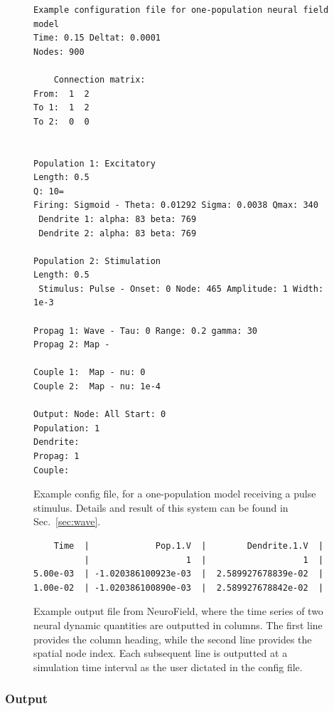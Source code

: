 \documentclass[preprint,review,10pt,authoryear,letterpaper]{elsarticle}
\begin{document}
\begin{figure}[!htbp]
\begin{center}
\begin{lstlisting}
Example configuration file for one-population neural field model
Time: 0.15 Deltat: 0.0001
Nodes: 900

    Connection matrix:
From:  1  2 
To 1:  1  2  
To 2:  0  0  


Population 1: Excitatory
Length: 0.5
Q: 10=
Firing: Sigmoid - Theta: 0.01292 Sigma: 0.0038 Qmax: 340
 Dendrite 1: alpha: 83 beta: 769
 Dendrite 2: alpha: 83 beta: 769

Population 2: Stimulation
Length: 0.5
 Stimulus: Pulse - Onset: 0 Node: 465 Amplitude: 1 Width: 1e-3 

Propag 1: Wave - Tau: 0 Range: 0.2 gamma: 30
Propag 2: Map - 

Couple 1:  Map - nu: 0
Couple 2:  Map - nu: 1e-4

Output: Node: All Start: 0 
Population: 1
Dendrite:  
Propag: 1
Couple:   
\end{lstlisting}
\caption{Example config file, for a one-population model receiving a pulse stimulus. Details and result of this system can be found in Sec.~\ref{sec:wave}.}
\label{fig:config_text}
\end{center}
\end{figure}

\begin{figure}[th]
\begin{center}
\begin{lstlisting}
    Time  |             Pop.1.V  |        Dendrite.1.V  |
          |                   1  |                   1  |
5.00e-03  | -1.020386100923e-03  |  2.589927678839e-02  |
1.00e-02  | -1.020386100890e-03  |  2.589927678842e-02  |
\end{lstlisting}
\caption{Example output file from NeuroField, where the time series of two neural dynamic quantities are outputted in columns. The first line provides the column heading, while the second line provides the spatial node index. Each subsequent line is outputted at a simulation time interval as the user dictated in the config file.}
\label{fig:output_text}
\end{center}
\end{figure}

\subsubsection{Output}
\end{document}
